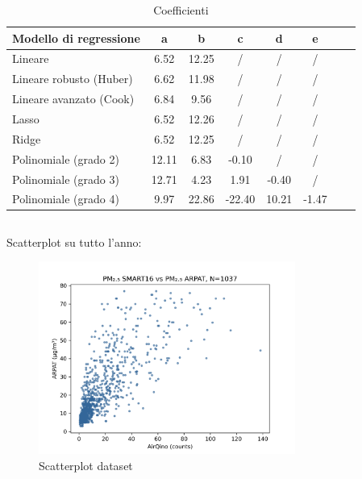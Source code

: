 \begin{table}[H]
    \footnotesize
    \centering
    \begin{tabular}{|l|c|c|c|c|c|c|c|}
    \hline
        \textbf{Modello di regressione} & \textbf{a} & \textbf{b} & \textbf{c} & \textbf{d} & \textbf{e} \\ \hline
        Lineare & 6.52 & 12.25 & / & / & / \\ \hline
        Lineare robusto (Huber) & 6.62 & 11.98 & / & / & / \\ \hline
        Lineare avanzato (Cook) & 6.84 & 9.56 & / & / & / \\ \hline
        Lasso & 6.52 & 12.26 & / & / & / \\ \hline
        Ridge & 6.52 & 12.25 & / & / & / \\ \hline
        Polinomiale (grado 2) & 12.11 & 6.83 & -0.10 & / & / \\ \hline
        Polinomiale (grado 3) & 12.71 & 4.23 & 1.91 & -0.40 & / \\ \hline
        Polinomiale (grado 4) & 9.97 & 22.86 & -22.40 & 10.21 & -1.47 \\ \hline
    \end{tabular}
    \caption[caption]{Coefficienti\protect\footnotemark}
    \label{fig:risultati-no2-coefficienti}
\end{table}



\subsection{}\label{ssec:risultati-pm2.5}

Scatterplot su tutto l'anno:
\begin{figure}[H]
\centering
\includegraphics[width=0.75\textwidth,height=\textheight,keepaspectratio]{img/sc_pm2.5.png}
\caption{Scatterplot dataset }
\label{fig:scatterplot_pm2.5}
\end{figure}

